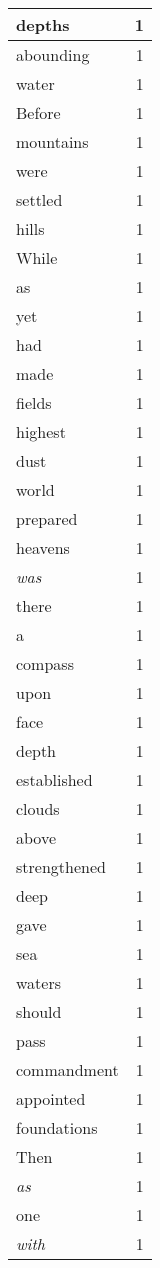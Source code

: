 \begin{center}
\begin{longtable}{l|r}
depths & 1\\ \hline 
abounding & 1\\ \hline 
water & 1\\ \hline 
Before & 1\\ \hline 
mountains & 1\\ \hline 
were & 1\\ \hline 
settled & 1\\ \hline 
hills & 1\\ \hline 
While & 1\\ \hline 
as & 1\\ \hline 
yet & 1\\ \hline 
had & 1\\ \hline 
made & 1\\ \hline 
fields & 1\\ \hline 
highest & 1\\ \hline 
dust & 1\\ \hline 
world & 1\\ \hline 
prepared & 1\\ \hline 
heavens & 1\\ \hline 
\emph{was} & 1\\ \hline 
there & 1\\ \hline 
a & 1\\ \hline 
compass & 1\\ \hline 
upon & 1\\ \hline 
face & 1\\ \hline 
depth & 1\\ \hline 
established & 1\\ \hline 
clouds & 1\\ \hline 
above & 1\\ \hline 
strengthened & 1\\ \hline 
deep & 1\\ \hline 
gave & 1\\ \hline 
sea & 1\\ \hline 
waters & 1\\ \hline 
should & 1\\ \hline 
pass & 1\\ \hline 
commandment & 1\\ \hline 
appointed & 1\\ \hline 
foundations & 1\\ \hline 
Then & 1\\ \hline 
\emph{as} & 1\\ \hline 
one & 1\\ \hline 
\emph{with} & 1\\ \hline 

\end{longtable}
\end{center}
